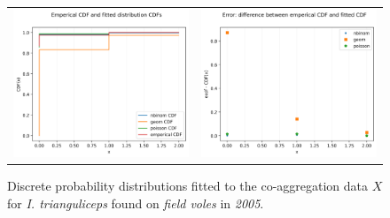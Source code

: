 \documentclass{article}
\begin{document}
\begin{figure}[h!]
	\centering
	\begin{tabular}{ll}
	\includegraphics[width=.48\linewidth,valign=m]{CDF_compare_2005_I.trianguliceps_FV} & \includegraphics[width=.48\linewidth,valign=m]{CDF_errors_2005_I.trianguliceps_FV}
	\end{tabular}
		\caption{Discrete probability distributions fitted to the co-aggregation data $ X $ for \textit{I. trianguliceps} found on \textit{field voles} in \textit{2005}.}
	\label{fig:kielder_2005_itrianguliceps_FV}
\end{figure}
\end{document}
